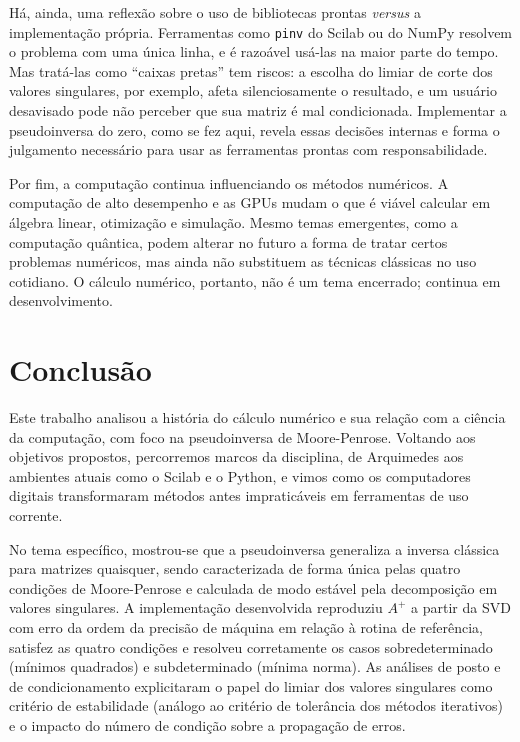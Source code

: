 \documentclass[12pt,a4paper,oneside]{report}
\newcommand{\Ap}{A^{+}}
\begin{document}
Há, ainda, uma reflexão sobre o uso de bibliotecas prontas \emph{versus} a implementação
própria. Ferramentas como \texttt{pinv} do Scilab ou do NumPy resolvem o problema com uma única
linha, e é razoável usá-las na maior parte do tempo. Mas tratá-las como ``caixas pretas'' tem
riscos: a escolha do limiar de corte dos valores singulares, por exemplo, afeta silenciosamente
o resultado, e um usuário desavisado pode não perceber que sua matriz é mal condicionada.
Implementar a pseudoinversa do zero, como se fez aqui, revela essas decisões internas e forma o
julgamento necessário para usar as ferramentas prontas com responsabilidade.

Por fim, a computação continua influenciando os métodos numéricos. A computação de alto desempenho e as GPUs mudam o que é viável calcular em álgebra linear, otimização e simulação. Mesmo temas emergentes, como a computação quântica, podem alterar no futuro a forma de tratar certos problemas numéricos, mas ainda não substituem as técnicas clássicas no uso cotidiano. O cálculo numérico, portanto, não é um tema encerrado; continua em desenvolvimento.

\chapter*{Conclusão}

Este trabalho analisou a história do cálculo numérico e sua relação com a ciência da computação, com foco na pseudoinversa de Moore-Penrose. Voltando aos objetivos propostos, percorremos marcos da disciplina, de Arquimedes aos ambientes atuais como o Scilab e o Python, e vimos como os computadores digitais transformaram métodos antes impraticáveis em ferramentas de uso corrente.

No tema específico, mostrou-se que a pseudoinversa generaliza a inversa clássica para matrizes
quaisquer, sendo caracterizada de forma única pelas quatro condições de Moore-Penrose e
calculada de modo estável pela decomposição em valores singulares. A implementação
desenvolvida reproduziu $\Ap$ a partir da SVD com erro da ordem da precisão de máquina em
relação à rotina de referência, satisfez as quatro condições e resolveu corretamente os casos
sobredeterminado (mínimos quadrados) e subdeterminado (mínima norma). As análises de posto e de
condicionamento explicitaram o papel do limiar dos valores singulares como critério de
estabilidade (análogo ao critério de tolerância dos métodos iterativos) e o impacto do
número de condição sobre a propagação de erros.
\end{document}
